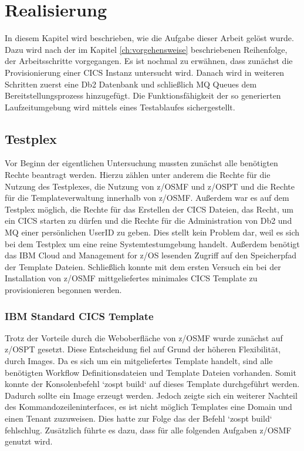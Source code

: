 \chapter{Realisierung}\label{ch:realisierung}
In diesem Kapitel wird beschrieben, wie die Aufgabe dieser Arbeit gelöst wurde.
Dazu wird nach der im Kapitel \ref{ch:vorgehensweise} beschriebenen Reihenfolge, der Arbeitsschritte vorgegangen.
Es ist nochmal zu erwähnen, dass zunächst die Provisionierung einer CICS Instanz untersucht wird.
Danach wird in weiteren Schritten zuerst eine Db2 Datenbank und schließlich MQ Queues dem Bereitstellungsprozess hinzugefügt.
Die Funktionsfähigkeit der so generierten Laufzeitumgebung wird mittels eines Testablaufes sichergestellt.

\section{Testplex}
Vor Beginn der eigentlichen Untersuchung mussten zunächst alle benötigten Rechte beantragt werden.
Hierzu zählen unter anderem die Rechte für die Nutzung des Testplexes, die Nutzung von z/OSMF und z/OSPT und die Rechte für die Templateverwaltung innerhalb von z/OSMF.
Außerdem war es auf dem Testplex möglich, die Rechte für das Erstellen der CICS Dateien, das Recht, um ein CICS starten zu dürfen und die Rechte für die Administration von Db2 und MQ einer persönlichen UserID zu geben.
Dies stellt kein Problem dar, weil es sich bei dem Testplex um eine reine Systemtestumgebung handelt.
Außerdem benötigt das IBM Cloud and Management for z/OS lesenden Zugriff auf den Speicherpfad der Template Dateien.
Schließlich konnte mit dem ersten Versuch ein bei der Installation von z/OSMF mittgeliefertes minimales CICS Template zu provisionieren begonnen werden.

\subsection{IBM Standard CICS Template}
Trotz der Vorteile durch die Weboberfläche von z/OSMF wurde zunächst auf z/OSPT gesetzt.
Diese Entscheidung fiel auf Grund der höheren Flexibilität, durch Images.
Da es sich um ein mitgeliefertes Template handelt, sind alle benötigten Workflow Definitionsdateien und Template Dateien vorhanden.
Somit konnte der Konsolenbefehl `zospt build` auf dieses Template durchgeführt werden.
Dadurch sollte ein Image erzeugt werden.
Jedoch zeigte sich ein weiterer Nachteil des Kommandozeileninterfaces, es ist nicht möglich Templates eine Domain und einen Tenant zuzuweisen.
Dies hatte zur Folge das der Befehl `zospt build` fehlschlug.
Zusätzlich führte es dazu, dass für alle folgenden Aufgaben z/OSMF genutzt wird.

